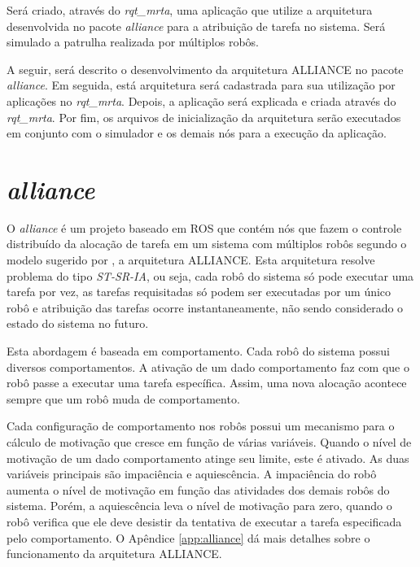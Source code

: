     Será criado, através do \textit{rqt\_mrta}, uma aplicação que utilize a arquitetura desenvolvida no pacote \textit{alliance} para a atribuição de tarefa no sistema. Será simulado a patrulha realizada por múltiplos robôs.
    
    A seguir, será descrito o desenvolvimento da arquitetura ALLIANCE no pacote \textit{alliance}. Em seguida, está arquitetura será cadastrada para sua utilização por aplicações no \textit{rqt\_mrta}. Depois, a aplicação será explicada e criada através do \textit{rqt\_mrta}. Por fim, os arquivos de inicialização da arquitetura serão executados em conjunto com o simulador e os demais nós para a execução da aplicação.

    \section{\textit{alliance}} \label{sec:alliance}
        O \textit{alliance} é um projeto baseado em ROS que contém nós que fazem o controle distribuído da alocação de tarefa em um sistema com múltiplos robôs segundo o modelo sugerido por , a arquitetura ALLIANCE. Esta arquitetura resolve problema do tipo \textit{ST-SR-IA}, ou seja, cada robô do sistema só pode executar uma tarefa por vez, as tarefas requisitadas só podem ser executadas por um único robô e atribuição das tarefas ocorre instantaneamente, não sendo considerado o estado do sistema no futuro.
        
        Esta abordagem é baseada em comportamento. Cada robô do sistema possui diversos comportamentos. A ativação de um dado comportamento faz com que o robô passe a executar uma tarefa específica. Assim, uma nova alocação acontece sempre que um robô muda de comportamento. 
        
        Cada configuração de comportamento nos robôs possui um mecanismo para o cálculo de motivação que cresce em função de várias variáveis. Quando o nível de motivação de um dado comportamento atinge seu limite, este é ativado. As duas variáveis principais são impaciência e aquiescência. A impaciência do robô aumenta o nível de motivação em função das atividades dos demais robôs do sistema. Porém, a aquiescência leva o nível de motivação para zero, quando o robô verifica que ele deve desistir da tentativa de executar a tarefa especificada pelo comportamento. O Apêndice \ref{app:alliance} dá mais detalhes sobre o funcionamento da arquitetura ALLIANCE.
        
